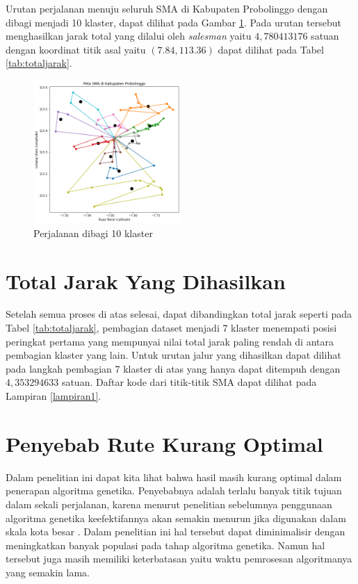 Urutan perjalanan menuju seluruh SMA di Kabupaten Probolinggo dengan dibagi menjadi 10 klaster, dapat dilihat pada Gambar \ref{fig:hasil_mtsp10}. Pada urutan tersebut menghasilkan jarak total yang dilalui oleh \textit{salesman} yaitu $4,780413176$ satuan dengan koordinat titik asal yaitu $(7.84, 113.36)$ dapat dilihat pada Tabel \ref{tab:totaljarak}.

\begin{figure}[H]
\centering
\includegraphics[width=0.5\textwidth]{Gambar/hasil_mtsp/10}
\caption{Perjalanan dibagi 10 klaster}
\label{fig:hasil_mtsp10}
\end{figure}

\section{Total Jarak Yang Dihasilkan}
Setelah semua proses di atas selesai, dapat dibandingkan total jarak seperti pada Tabel \ref{tab:totaljarak}, pembagian dataset  menjadi 7 klaster menempati posisi peringkat pertama yang mempunyai nilai total jarak paling rendah di antara pembagian klaster yang lain. Untuk urutan jalur yang dihasilkan dapat dilihat pada langkah pembagian 7 klaster di atas yang hanya dapat ditempuh dengan $4,353294633$ satuan. Daftar kode dari titik-titik SMA dapat dilihat pada Lampiran \ref{lampiran1}.



\section{Penyebab Rute Kurang Optimal}

Dalam penelitian ini dapat kita lihat bahwa hasil masih kurang optimal dalam penerapan algoritma genetika. Penyebabnya adalah terlalu banyak titik tujuan dalam sekali perjalanan, karena menurut penelitian sebelumnya penggunaan algoritma genetika keefektifannya akan semakin menurun jika digunakan dalam skala kota besar \cite{inproceedings}. Dalam penelitian ini hal tersebut dapat diminimalisir dengan meningkatkan banyak populasi pada tahap algoritma genetika. Namun hal tersebut juga masih memiliki keterbatasan yaitu waktu pemrosesan algoritmanya yang semakin lama.